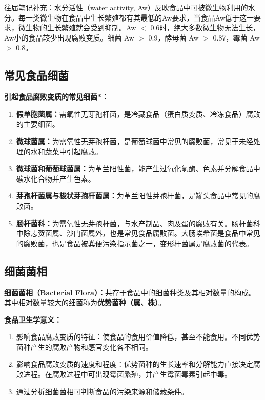 \begin{tipbox}
往届笔记补充：水分活性（water activity, Aw）反映食品中可被微生物利用的水分。每一类微生物在食品中生长繁殖都有其最低的Aw要求，当食品Aw低于这一要求，微生物的生长繁殖就会受到抑制。Aw $<$ 0.6时，绝大多数微生物无法生长，Aw小的食品较少出现腐败变质。细菌 Aw $>$ 0.9，酵母菌 Aw $>$ 0.87，霉菌 Aw $>$ 0.8。
\end{tipbox}

\subsection{常见食品细菌}

\begin{keybox}
\textbf{引起食品腐败变质的常见细菌*：}

\begin{enumerate}[leftmargin=*]
    \item \textbf{假单胞菌属：}需氧性无芽孢杆菌，是冷藏食品（蛋白质变质、冷冻食品）腐败的主要细菌。
    \item \textbf{微球菌属：}为需氧性无芽孢杆菌，是葡萄球菌中常见的腐败菌，常见于未经处理的水和蔬菜中引起腐败。
    \item \textbf{微球菌和葡萄球菌属：}为革兰阳性菌，能产生过氧化氢酶、色素并分解食品中碳水化合物并产生色素。
    \item \textbf{芽孢杆菌属与梭状芽孢杆菌属：}为革兰阳性芽孢杆菌，是罐头食品中常见的腐败菌。
    \item \textbf{肠杆菌科：}为需氧性无芽孢杆菌，与水产制品、肉及蛋的腐败有关。肠杆菌科中除志贺菌属、沙门菌属外，也是常见食品腐败菌。大肠埃希菌是食品中常见的腐败菌，也是食品被粪便污染指示菌之一，变形杆菌属是腐败菌的代表。
\end{enumerate}
\end{keybox}

\subsection{细菌菌相}

\begin{defbox}
\textbf{细菌菌相（Bacterial Flora）：}共存于食品中的细菌种类及其相对数量的构成。其中相对数量较大的细菌称为\textbf{优势菌种（属、株）}。

\textbf{食品卫生学意义：}
\begin{enumerate}[leftmargin=*]
    \item 影响食品腐败变质的特征：使食品的食用价值降低，甚至不能食用。不同优势菌种产生的腐败产物和感官变化各不相同。
    \item 影响食品腐败变质的速度和程度：优势菌种的生长速率和分解能力直接决定腐败进程。在腐败过程中可出现霉菌繁殖，并产生霉菌毒素引起中毒。
    \item 通过分析细菌菌相可判断食品的污染来源和储藏条件。
\end{enumerate}
\end{defbox}

